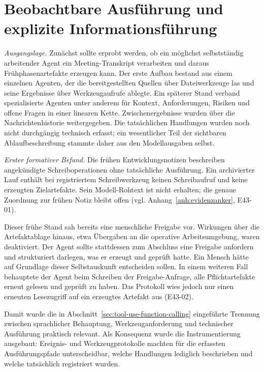 \section{Beobachtbare Ausführung und explizite Informationsführung}
\label{sec:beobachtbare-ausfuehrung-informationsfuehrung}

\emph{Ausgangslage.} Zunächst sollte erprobt werden, ob ein möglichst
selbstständig arbeitender Agent ein Meeting-Transkript verarbeiten und
daraus Frühphasenartefakte erzeugen kann. Der erste Aufbau bestand aus
einem einzelnen Agenten, der die bereitgestellten Quellen über
Dateiwerkzeuge las und seine Ergebnisse über Werkzeugaufrufe ablegte.
Ein späterer Stand verband spezialisierte Agenten unter anderem für Kontext,
Anforderungen, Risiken und offene Fragen in einer linearen Kette.
Zwischenergebnisse wurden über die Nachrichtenhistorie weitergegeben.
Die tatsächlichen Handlungen wurden noch nicht durchgängig technisch
erfasst; ein wesentlicher Teil der sichtbaren Ablaufbeschreibung
stammte daher aus den Modellausgaben selbst.

\emph{Erster formativer Befund.} Die frühen Entwicklungsnotizen
beschreiben angekündigte Schreiboperationen ohne tatsächliche
Ausführung. Ein archivierter Lauf enthält bei registriertem
Schreibwerkzeug keinen Schreibaufruf und keine erzeugten
Zielartefakte. Sein Modell-Rohtext ist nicht erhalten; die genaue
Zuordnung zur frühen Notiz bleibt offen
(vgl. Anhang~\ref{anh:evidenzanker}, E43-01).

Dieser frühe Stand sah bereits eine menschliche Freigabe vor.
Wirkungen über die Artefaktablage hinaus, etwa Übergaben an die
operative Arbeitsumgebung, waren deaktiviert. Der Agent sollte
stattdessen zum Abschluss eine Freigabe anfordern und strukturiert
darlegen, was er erzeugt und geprüft hatte. Ein Mensch hätte auf
Grundlage dieser Selbstauskunft entscheiden sollen. In einem
weiteren Fall behauptete der Agent beim Schreiben der Freigabe-Anfrage,
alle Pflichtartefakte erneut gelesen und geprüft zu haben. Das
Protokoll wies jedoch nur einen erneuten Lesezugriff auf ein
erzeugtes Artefakt aus (E43-02).

Damit wurde die in Abschnitt~\ref{sec:tool-use-function-calling}
eingeführte Trennung zwischen sprachlicher Behauptung,
Werkzeuganforderung und technischer Ausführung praktisch relevant.
Als Konsequenz wurde die Instrumentierung ausgebaut: Ereignis- und
Werkzeugprotokolle machten für die erfassten Ausführungspfade
unterscheidbar, welche Handlungen lediglich beschrieben und welche
tatsächlich registriert wurden.

